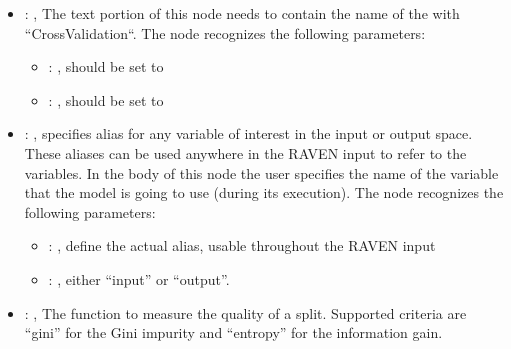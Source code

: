 \begin{itemize}
\begin{itemize}
        \item {}: ,
          List of IDs of features/variables to include in the transformation process.

        \item {}: ,
          Which space to search? Target or Feature?
      \end{itemize}

    \item {}: ,
      The text portion of this node needs to contain the name of the  with
               ``CrossValidation``.
      The  node recognizes the following parameters:
        \begin{itemize}
          \item {}: ,
            should be set to 
          \item {}: ,
            should be set to 
      \end{itemize}

    \item {}: ,
      specifies alias for         any variable of interest in the input or output space. These
      aliases can be used anywhere in the RAVEN input to         refer to the variables. In the body
      of this node the user specifies the name of the variable that the model is going to use
      (during its execution).
      The  node recognizes the following parameters:
        \begin{itemize}
          \item {}: ,
            define the actual alias, usable throughout the RAVEN input
          \item {}: ,
            either ``input'' or ``output''.
      \end{itemize}

    \item {}: ,
      The function to measure the quality of a split. Supported criteria are ``gini'' for the
      Gini impurity and ``entropy'' for the information gain.


\end{itemize}
